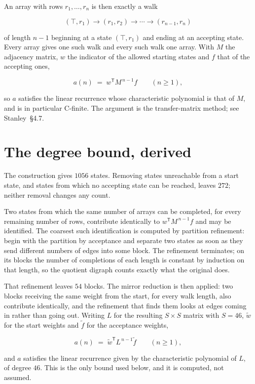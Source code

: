 \documentclass[11pt]{article}
\theoremstyle{definition}
\begin{document}
An array with rows $r_1,\dots,r_n$ is then exactly a walk

\[(\top,r_1) \to (r_1,r_2) \to \cdots \to (r_{n-1},r_n)\]

of length $n-1$ beginning at a state $(\top,r_1)$ and ending at an accepting state. Every array gives one such walk and every such walk one array. With $M$ the adjacency matrix, $w$ the indicator of the allowed starting states and $f$ that of the accepting ones,

\[a(n) \;=\; w^{\mathsf T} M^{\,n-1} f \qquad (n \ge 1),\]

so $a$ satisfies the linear recurrence whose characteristic polynomial is that of $M$, and is in particular C-finite. The argument is the transfer-matrix method; see Stanley~\S4.7.

\section{The degree bound, derived}

The construction gives $1056$ states. Removing states unreachable from a start state, and states from which no accepting state can be reached, leaves $272$; neither removal changes any count.

Two states from which the same number of arrays can be completed, for every remaining number of rows, contribute identically to $w^{\mathsf T}M^{\,n-1}f$ and may be identified. The coarsest such identification is computed by partition refinement: begin with the partition by acceptance and separate two states as soon as they send different numbers of edges into some block. The refinement terminates; on its blocks the number of completions of each length is constant by induction on that length, so the quotient digraph counts exactly what the original does.

That refinement leaves $54$ blocks. The mirror reduction is then applied: two blocks receiving the same weight from the start, for every walk length, also contribute identically, and the refinement that finds them looks at edges coming in rather than going out. Writing $L$ for the resulting $S \times S$ matrix with $S = 46$, $\tilde w$ for the start weights and $\tilde f$ for the acceptance weights,

\[a(n) \;=\; \tilde w^{\mathsf T} L^{\,n-1} \tilde f \qquad (n \ge 1),\]

and $a$ satisfies the linear recurrence given by the characteristic polynomial of $L$, of degree $46$. This is the only bound used below, and it is computed, not assumed.
\end{document}
